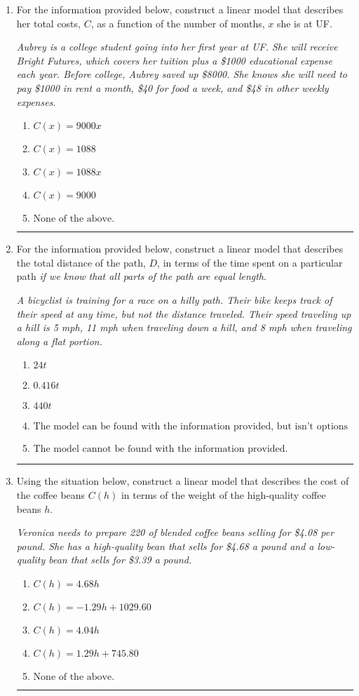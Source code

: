 \documentclass[14pt]{extbook}
\newcommand{\litem}[1]{\item#1\hspace*{-1cm}\rule{\textwidth}{0.4pt}}
\begin{document}
\begin{enumerate}
\litem{
For the information provided below, construct a linear model that describes her total costs, $C$, as a function of the number of months, $x$ she is at UF. 
\begin{center}
    \textit{ Aubrey is a college student going into her first year at UF. She will receive Bright Futures, which covers her tuition plus a \$1000 educational expense each year. Before college, Aubrey saved up \$8000. She knows she will need to pay \$1000 in rent a month, \$40 for food a week, and \$48 in other weekly expenses. }
\end{center}
\begin{enumerate}[label=\Alph*.]
\item \( C(x) = 9000 x \)
\item \( C(x) = 1088 \)
\item \( C(x) = 1088 x \)
\item \( C(x) = 9000 \)
\item \( \text{None of the above.} \)

\end{enumerate} }
\litem{
For the information provided below, construct a linear model that describes the total distance of the path, $D$, in terms of the time spent on a particular path \textit{if we know that all parts of the path are equal length}.
\begin{center}
    \textit{ A bicyclist is training for a race on a hilly path. Their bike keeps track of their speed at any time, but not the distance traveled. Their speed traveling up a hill is 5 mph, 11 mph when traveling down a hill, and 8 mph when traveling along a flat portion. }
\end{center}
\begin{enumerate}[label=\Alph*.]
\item \( 24 t \)
\item \( 0.416 t \)
\item \( 440 t \)
\item \( \text{The model can be found with the information provided, but isn't options 1-3.} \)
\item \( \text{The model cannot be found with the information provided.} \)

\end{enumerate} }
\litem{
Using the situation below, construct a linear model that describes the cost of the coffee beans $C(h)$ in terms of the weight of the high-quality coffee beans $h$.
\begin{center}
    \textit{ Veronica needs to prepare 220 of blended coffee beans selling for \$4.08 per pound. She has a high-quality bean that sells for \$4.68 a pound and a low-quality bean that sells for \$3.39 a pound. }
\end{center}
\begin{enumerate}[label=\Alph*.]
\item \( C(h) = 4.68 h \)
\item \( C(h) = -1.29 h + 1029.60 \)
\item \( C(h) = 4.04 h \)
\item \( C(h) = 1.29 h + 745.80 \)
\item \( \text{None of the above.} \)


\end{enumerate}}
\end{enumerate}
\end{document}
